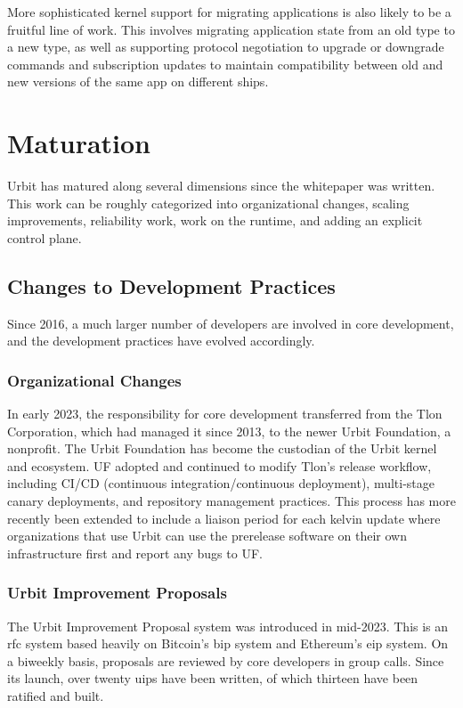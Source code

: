 \documentclass[twoside]{article}
\begin{document}
More sophisticated kernel support for migrating applications is also likely to be a fruitful line of work.  This involves migrating application state from an old type to a new type, as well as supporting protocol negotiation to upgrade or downgrade commands and subscription updates to maintain compatibility between old and new versions of the same app on different ships.

\section{Maturation}

Urbit has matured along several dimensions since the whitepaper was written.  This work can be roughly categorized into organizational changes, scaling improvements, reliability work, work on the runtime, and adding an explicit control plane.

\subsection{Changes to Development Practices}

Since 2016, a much larger number of developers are involved in core development, and the development practices have evolved accordingly.

\subsubsection{Organizational Changes}

In early 2023, the responsibility for core development transferred from the Tlon Corporation, which had managed it since 2013, to the newer Urbit Foundation, a nonprofit.  The Urbit Foundation has become the custodian of the Urbit kernel and ecosystem.  UF adopted and continued to modify Tlon's release workflow, including CI/CD (continuous integration/continuous deployment), multi-stage canary deployments, and repository management practices.  This process has more recently been extended to include a liaison period for each kelvin update where organizations that use Urbit can use the prerelease software on their own infrastructure first and report any bugs to UF.

\subsubsection{Urbit Improvement Proposals}

The Urbit Improvement Proposal system was introduced in mid-2023.  This is an {\sc rfc} system based heavily on Bitcoin's {\sc bip} system and Ethereum's {\sc eip} system.  On a biweekly basis, proposals are reviewed by core developers in group calls.  Since its launch, over twenty {\sc uip}s have been written, of which thirteen have been ratified and built.
\end{document}
